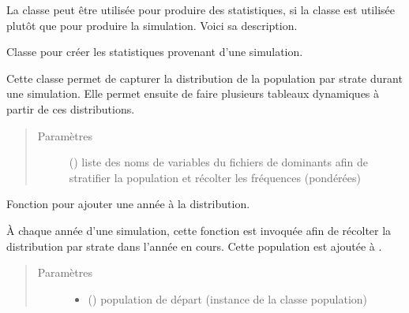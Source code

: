 \documentclass[letterpaper,10pt,french]{sphinxmanual}
\begin{document}
La classe  peut  être utilisée pour produire des statistiques, si la classe  est utilisée plutôt que  pour produire la simulation. Voici sa description.

\begin{fulllineitems}
\label{\detokenize{code:simgen.statistics}}
Classe pour créer les statistiques provenant d’une simulation.

Cette classe permet de capturer la distribution de la population par strate durant une simulation. Elle permet ensuite de faire plusieurs tableaux dynamiques à partir de ces distributions.
\begin{quote}\begin{description}
\item[{Paramètres}] \leavevmode
{} () \textendash{} liste des noms de variables du fichiers de dominants afin de stratifier la population et récolter les fréquences (pondérées)

\end{description}\end{quote}

\begin{fulllineitems}
\label{\detokenize{code:simgen.statistics.add}}
Fonction pour ajouter une année à la distribution.

À chaque année d’une simulation, cette fonction est invoquée afin de récolter la distribution par strate dans l’année en cours. Cette population est ajoutée à .
\begin{quote}\begin{description}
\item[{Paramètres}] \leavevmode\begin{itemize}
\item {} 
 ({\hyperref[\detokenize{code:simgen.population}]{}}) \textendash{} population de départ (instance de la classe population)


\end{itemize}
\end{description}
\end{quote}
\end{fulllineitems}
\end{fulllineitems}
\end{document}
